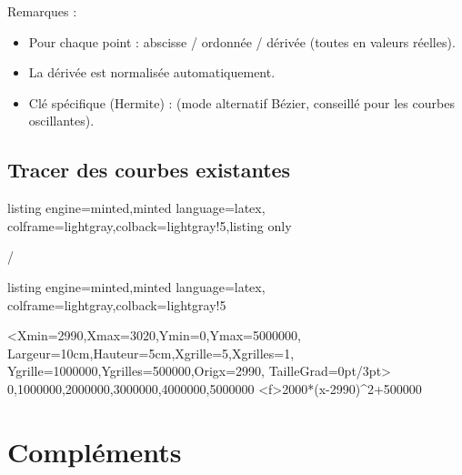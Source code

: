 \documentclass[11pt,a4paper]{ltxdoc}
\begin{document}
Remarques :

\begin{itemize}
  \item Pour chaque point : abscisse / ordonnée / dérivée (toutes en valeurs réelles).
  \item La dérivée est normalisée automatiquement.
  \item Clé spécifique (Hermite) :  (mode alternatif Bézier, conseillé pour les courbes oscillantes).
\end{itemize}

\subsection{Tracer des courbes existantes}

\begin{tcblisting}{listing engine=minted,minted language=latex,
  colframe=lightgray,colback=lightgray!5,listing only}

\tkzGrphTracerCourbe / \tkzGrphTracerCourbes
\end{tcblisting}

\begin{tcblisting}{listing engine=minted,minted language=latex,
  colframe=lightgray,colback=lightgray!5}
\begin{tkzGrph}%
    <Xmin=2990,Xmax=3020,Ymin=0,Ymax=5000000,
    Largeur=10cm,Hauteur=5cm,Xgrille=5,Xgrilles=1,
    Ygrille=1000000,Ygrilles=500000,Origx=2990,%
    TailleGrad=0pt/3pt>
     {0,1000000,2000000,3000000,4000000,5000000}
  \tkzGrphDefinirCourbe[Nom=cf]<f>{2000*(x-2990)^2+500000}
\end{tkzGrph}
\end{tcblisting}

\pagebreak

\section{Compléments}
\end{document}
